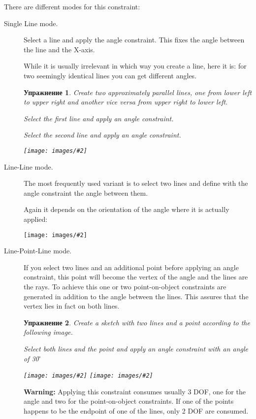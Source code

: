 \documentclass[12pt,titlepage]{article}
\newcommand{\degree}{\ensuremath{^\circ}}
\newcommand{\icon}[1]{\raisebox{-1em}{\rule{0pt}{27pt}\texttt{[image: images/\#1]}}}
\newcommand{\img}[2]{\vspace{2ex}\noindent\texttt{[image: images/\#2]}}
\newtheorem{Exercise}{Упражнение}
\begin{document}
\begin {itemize}
There are different modes for this constraint:

\begin{description}
\item [Single Line mode.] Select a line and apply the angle constraint. This
      fixes the angle between the line and the X-axis.
      
      While it is usually irrelevant in which way you create a line, here it
      is: for two seemingly identical lines you can get different angles.

\begin{Exercise}
Create two approximately parallel lines, one from lower left to upper right
and another vice versa from upper right to lower left.

Select the first line and apply an angle constraint.

Select the second line and apply an angle constraint.

\img{}{AngleXAxis}
\end{Exercise}
      
\item [Line-Line mode.] The most frequently used variant is to select two lines
      and define with the angle constraint the angle between them.
      
      Again it depends on the orientation of the angle where it is actually
      applied:

\img{}{AngleLineLine}

\item [Line-Point-Line mode.]
      If you select two lines and an additional point before applying an
      angle constraint, this point will become the vertex of the angle and the
      lines are the rays. To achieve this one or two point-on-object constraints are
      generated in addition to the angle between the lines. This assures that the
      vertex lies in fact on both lines.
\begin{Exercise}
Create a sketch with two lines and a point according to the following image.


Select both lines and the point and apply an angle constraint with an angle of
30\degree

\img{}{AngleLinePointLine1}
\hspace{2em}
\raisebox{1cm}{$\stackrel{\icon{Constraint_InternalAngle}}{\longrightarrow}$}
\hspace{2em}
\img{}{AngleLinePointLine2}
\end{Exercise}

{\bf Warning:} Applying this constraint consumes usually 3 DOF, one for the
angle and two for the point-on-object constraints. If one of the points
happens to be the endpoint of one of the lines, only 2 DOF are consumed.


\end{description}
\end{itemize}
\end{document}
